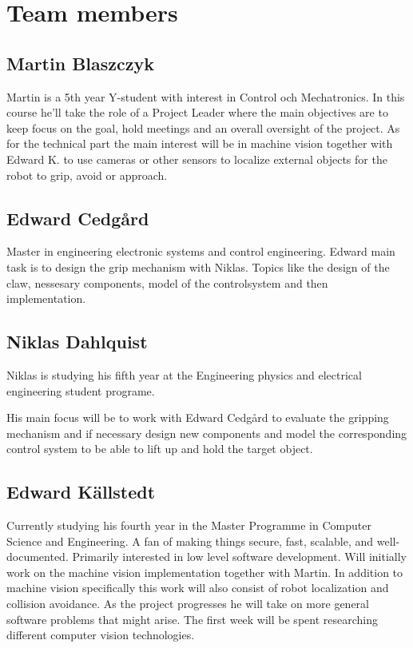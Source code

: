 \section{Team members}

\subsection{Martin Blaszczyk}
Martin is a 5th year Y-student with interest in Control och Mechatronics. 
In this course he'll take the role of a Project Leader where the main objectives
are to keep focus on the goal, hold meetings and an overall oversight of the project. 
As for the technical part the main interest will be in machine vision together with
Edward K. to use cameras or other sensors to localize external objects for the 
robot to grip, avoid or approach. 

\subsection{Edward Cedgård}
Master in engineering electronic systems and control engineering.
Edward main task is to design the grip mechanism with Niklas. Topics like
the design of the claw, nessesary components, model of the controlsystem and then implementation. 

\subsection{Niklas Dahlquist}
Niklas is studying his fifth year at the Engineering physics and electrical engineering student programe.

His main focus will be to work with Edward Cedgård to evaluate the gripping mechanism and if necessary design new components and model the corresponding control system to be able to lift up and hold the target object.

\subsection{Edward Källstedt}
Currently studying his fourth year in the Master Programme in Computer Science and Engineering.
A fan of making things secure, fast, scalable, and well-documented. Primarily interested in
low level software development. Will initially work on the machine vision implementation 
together with Martin. In addition to machine vision specifically this work will also consist
of robot localization and collision avoidance. As the project progresses he will take on more
general software problems that might arise. The first week will be spent researching different
computer vision technologies.

